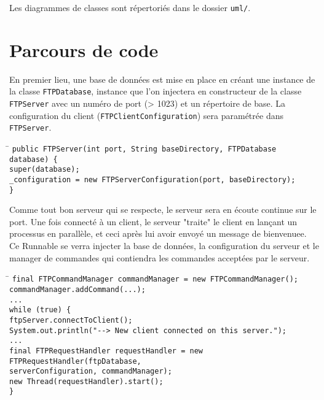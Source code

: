 Les diagrammes de classes sont répertoriés dans le dossier \verb+uml/+.

\section*{Parcours de code}
En premier lieu, une base de données est mise en place en créant une instance de la classe \verb+FTPDatabase+, instance que l'on injectera en constructeur de la classe \verb+FTPServer+ avec un numéro de port (> 1023) et un répertoire de base. La configuration du client (\verb+FTPClientConfiguration+) sera paramétrée dans \verb+FTPServer+.
\begin{tabbing}
\hspace{1cm}\=\kill
\verb+public FTPServer(int port, String baseDirectory, FTPDatabase database) {+\\
	\>\verb+super(database);+\\
	\>\verb+_configuration = new FTPServerConfiguration(port, baseDirectory);+\\
\verb+}+
\end{tabbing}
Comme tout bon serveur qui se respecte, le serveur sera en écoute continue sur le port. Une fois connecté à un client, le serveur "traite" le client en lançant un processus en parallèle, et ceci après lui avoir envoyé un message de bienvenuee. Ce Runnable se verra injecter la base de données, la configuration du serveur et le manager de commandes qui contiendra les commandes acceptées par le serveur.
\begin{tabbing}
\hspace{1cm}\=\kill
\verb+final FTPCommandManager commandManager = new FTPCommandManager();+\\
\verb+commandManager.addCommand(...);+\\
\verb+...+\\
\verb+while (true) {+\\
	\>\verb+ftpServer.connectToClient();+\\
	\>\verb+System.out.println("--> New client connected on this server.");+\\
	\>\verb+...+\\
	\>\verb+final FTPRequestHandler requestHandler = new FTPRequestHandler(ftpDatabase,+\\
	\>\verb+serverConfiguration, commandManager);+\\
	\>\verb+new Thread(requestHandler).start();+\\
		\verb+}+
\end{tabbing}

